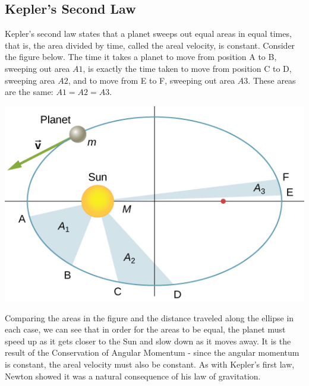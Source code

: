 \documentclass[9pt]{article}
\begin{document}
	\subsection*{Kepler's Second Law}
	 Kepler’s second law states that a planet sweeps out equal areas in equal times, that is, the area divided by time, called the areal velocity, is constant. Consider the figure below. The time it takes a planet to move from position A to B, sweeping out area $A1$, is exactly the time taken to move from position C to D, sweeping area $A2$, and to move from E to F, sweeping out area $A3$. These areas are the same: $A1=A2=A3$.
	\begin{center}
		\includegraphics[scale=0.7]{areal_velocity.jpeg}
	\end{center}
	Comparing the areas in the figure and the distance traveled along the ellipse in each case, we can see that in order for the areas to be equal, the planet must speed up as it gets closer to the Sun and slow down as it moves away. It is the result of the Conservation of Angular Momentum - since the angular momentum is constant, the areal velocity must also be constant. As with Kepler’s first law, Newton showed it was a natural consequence of his law of gravitation.
\end{document}
